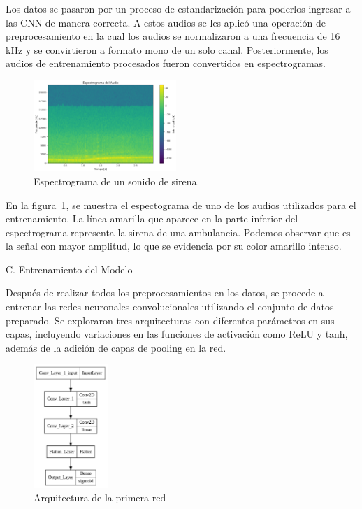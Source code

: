 \documentclass[conference, spanish, english]{IEEEtran}
\begin{document}
Los datos se pasaron por un proceso de estandarización para poderlos ingresar a las CNN de manera correcta. A estos audios se les aplicó una operación de preprocesamiento en la cual los audios se normalizaron a una frecuencia de 16 kHz y se convirtieron a formato mono de un solo canal. Posteriormente, los audios de entrenamiento procesados fueron convertidos en espectrogramas.

\begin{figure}[H]
\centering
\includegraphics[width=0.48\textwidth]{espectrogramas/espectrograma.png}
\caption{Espectrograma de un sonido de sirena.}
\label{fig:espectograma}
\end{figure}


En la figura~\ref{fig:espectograma}, se muestra el espectograma de uno de los audios utilizados para el entrenamiento. La línea amarilla que aparece en la parte inferior del espectrograma representa la sirena de una ambulancia. Podemos observar que es la señal con mayor amplitud, lo que se evidencia por su color amarillo intenso.

\begin{center}
    C. Entrenamiento del Modelo
\end{center}

Después de realizar todos los preprocesamientos en los datos, se procede a entrenar las redes neuronales convolucionales utilizando el conjunto de datos preparado. Se exploraron tres arquitecturas con diferentes parámetros en sus capas, incluyendo variaciones en las funciones de activación como ReLU y tanh, además de la adición de capas de pooling en la red.

\begin{figure}[H]
\centering
\includegraphics[width=0.25\textwidth]{architecture/architecture_2.png}
\caption{Arquitectura de la primera red}
\label{fig:arquitectura1}
\end{figure}
\end{document}
